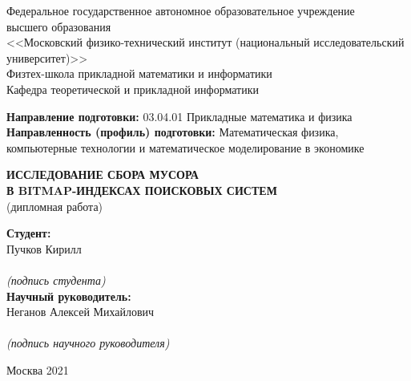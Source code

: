 \begin{center}
    Федеральное государственное автономное образовательное учреждение\\ 
    высшего образования\\
    <<Московский физико-технический институт (национальный исследовательский университет)>>\\
    Физтех-школа прикладной математики и информатики\\
    Кафедра теоретической и прикладной информатики\\
\end{center}

\vspace{2mm}

\begin{flushleft}
\textbf{Направление подготовки:} 03.04.01 Прикладные математика и физика\\
\textbf{Направленность (профиль) подготовки:} Математическая физика,\\компьютерные технологии и математическое моделирование в экономике\\
\end{flushleft}

\vspace{24mm}

\begin{center}
    \large{\textbf{ ИССЛЕДОВАНИЕ СБОРА МУСОРА\\В BITMAP-ИНДЕКСАХ ПОИСКОВЫХ СИСТЕМ}}\\
    (дипломная работа)\\
\end{center}

\vspace{20mm}

\hspace{90mm}
\begin{minipage}{0.4\textwidth}
\begin{flushleft}
\textbf{Студент:}\\Пучков Кирилл\\
\vspace{4mm}
\hrulefill\\
{\centering\scriptsize\textit{(подпись студента)}\\}
\textbf{Научный руководитель:}\\Неганов Алексей Михайлович\\
\vspace{4mm}
\hrulefill\\
{\centering\scriptsize\textit{(подпись научного руководителя)}\\}
\end{flushleft}
\end{minipage}

\vspace*{\fill}

\begin{center}
Москва 2021
\end{center}

\thispagestyle{empty}